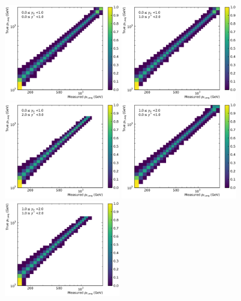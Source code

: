 \begin{figure}[htp]
    \centering
    \includegraphics[width=0.45\textwidth]{figures/measurement/res_matrix_ptavg_normalized_yb0ys0.pdf}\hfill
    \includegraphics[width=0.45\textwidth]{figures/measurement/res_matrix_ptavg_normalized_yb0ys1.pdf}
    \includegraphics[width=0.45\textwidth]{figures/measurement/res_matrix_ptavg_normalized_yb0ys2.pdf}\hfill
    \includegraphics[width=0.45\textwidth]{figures/measurement/res_matrix_ptavg_normalized_yb1ys0.pdf}
    \includegraphics[width=0.45\textwidth]{figures/measurement/res_matrix_ptavg_normalized_yb1ys1.pdf}\hfill

\end{figure}
